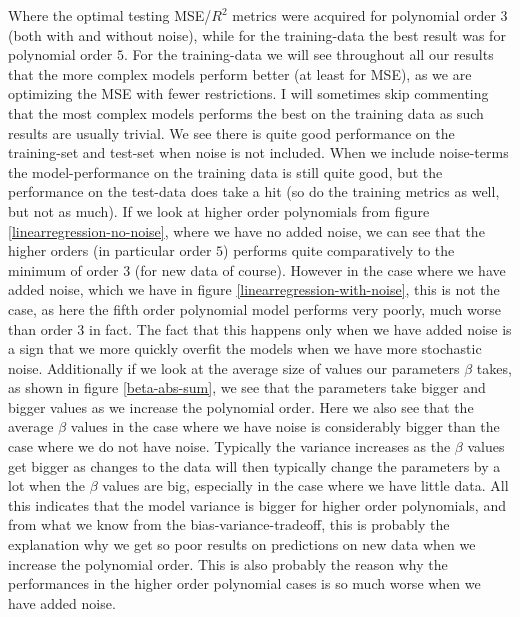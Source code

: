 \documentclass{article}
\begin{document}
Where the optimal testing MSE/$R^2$ metrics were acquired for polynomial order
$3$ (both with and without noise), while for the training-data the best result
was for polynomial order $5$. For the training-data we will see throughout all
our results that the more complex models perform better (at least for MSE), as
we are optimizing the MSE with fewer restrictions. I will sometimes skip
commenting that the most complex models performs the best on the training data
as such results are usually trivial.  We see there is quite good performance on
the training-set and test-set when noise is not included.  When we include
noise-terms the model-performance on the training data is still quite good, but
the performance on the test-data does take a hit (so do the training metrics as
well, but not as much). If we look at higher order polynomials from figure
\ref{linearregression-no-noise}, where we have no added noise, we can see that
the higher orders (in particular order $5$) performs quite comparatively to the
minimum of order $3$ (for new data of course).  However in the case where we
have added noise, which we have in figure \ref{linearregression-with-noise},
this is not the case, as here the fifth order polynomial model performs very
poorly, much worse than order $3$ in fact. The fact that this happens only when
we have added noise is a sign that we more quickly overfit the models when we
have more stochastic noise.  Additionally if we look at the average size of
values our parameters $\beta$ takes, as shown in figure \ref{beta-abs-sum}, we
see that the parameters take bigger and bigger values as we increase the
polynomial order.  Here we also see that the average $\beta$ values in the case
where we have noise is considerably bigger than the case where we do not have
noise. Typically the variance increases as the $\beta$ values get bigger as
changes to the data will then typically change the parameters by a lot when the
$\beta$ values are big, especially in the case where we have little data. All
this indicates that the model variance is bigger for higher order polynomials,
and from what we know from the bias-variance-tradeoff, this is probably the
explanation why we get so poor results on predictions on new data when we
increase the polynomial order.  This is also probably the reason why the
performances in the higher order polynomial cases is so much worse when we have
added noise.
\end{document}
